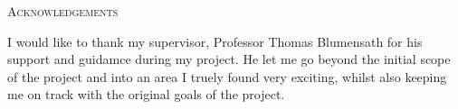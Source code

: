 \begin{center}
    \textsc{Acknowledgements}
\end{center}

I would like to thank my supervisor, Professor Thomas Blumensath for his support and guidamce during my project. He let me go beyond the initial scope of the project and into an area I truely found very exciting, whilst also keeping me on track with the original goals of the project.
